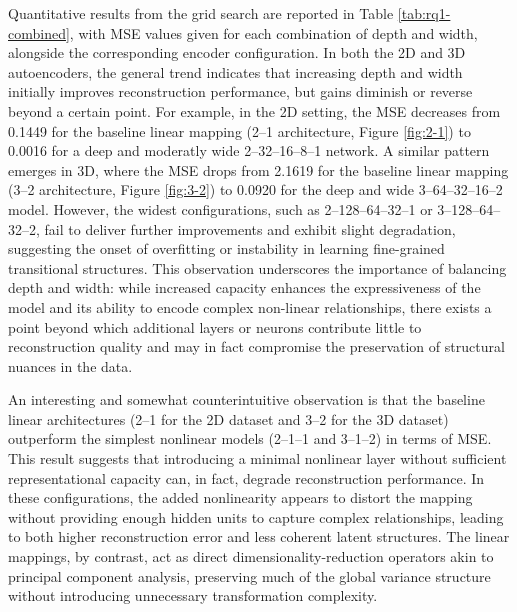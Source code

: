 Quantitative results from the grid search are reported in Table \ref{tab:rq1-combined}, with MSE values given for each combination of depth and width, alongside the corresponding encoder configuration. In both the 2D and 3D autoencoders, the general trend indicates that increasing depth and width initially improves reconstruction performance, but gains diminish or reverse beyond a certain point. For example, in the 2D setting, the MSE decreases from 0.1449 for the baseline linear mapping (2–1 architecture, Figure \ref{fig:2-1}) to 0.0016 for a deep and moderatly wide 2–32–16–8–1 network. A similar pattern emerges in 3D, where the MSE drops from 2.1619 for the baseline linear mapping (3–2 architecture, Figure \ref{fig:3-2}) to 0.0920 for the deep and wide 3–64–32–16–2 model. However, the widest configurations, such as 2–128–64–32–1 or 3–128–64–32–2, fail to deliver further improvements and exhibit slight degradation, suggesting the onset of overfitting or instability in learning fine-grained transitional structures. This observation underscores the importance of balancing depth and width: while increased capacity enhances the expressiveness of the model and its ability to encode complex non-linear relationships, there exists a point beyond which additional layers or neurons contribute little to reconstruction quality and may in fact compromise the preservation of structural nuances in the data.

An interesting and somewhat counterintuitive observation is that the baseline linear architectures (2–1 for the 2D dataset and 3–2 for the 3D dataset) outperform the simplest nonlinear models (2–1–1 and 3–1–2) in terms of MSE. This result suggests that introducing a minimal nonlinear layer without sufficient representational capacity can, in fact, degrade reconstruction performance. In these configurations, the added nonlinearity appears to distort the mapping without providing enough hidden units to capture complex relationships, leading to both higher reconstruction error and less coherent latent structures. The linear mappings, by contrast, act as direct dimensionality-reduction operators akin to principal component analysis, preserving much of the global variance structure without introducing unnecessary transformation complexity.

